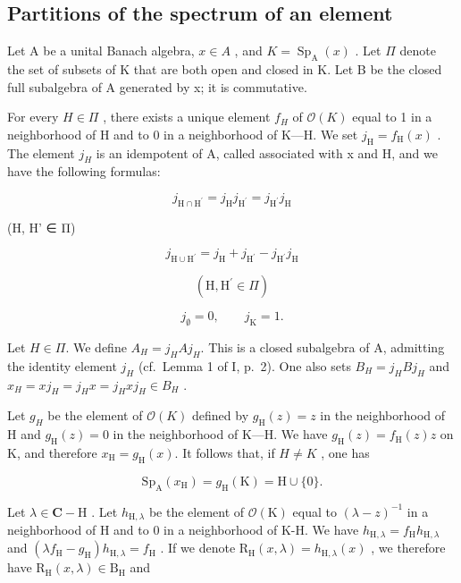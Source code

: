 \subsection{Partitions of the spectrum of an element}

Let A be a unital Banach algebra, \(x \in A\) , and \(K = \operatorname{Sp}_{\mathrm{A}}(x)\) . Let \(\Pi\) denote the set of subsets of K that are both open and closed in K. Let B be the closed full subalgebra of A generated by x; it is commutative.

For every \(H \in \Pi\) , there exists a unique element \(f_{H}\) of \(\mathcal{O}(K)\) equal to 1 in a neighborhood of H and to 0 in a neighborhood of K---H. We set \(j_{\mathrm{H}} = f_{\mathrm{H}}(x)\) . The element \(j_{H}\) is an idempotent of A, called associated with x and H, and we have the following formulas:

\[
j _ {\mathrm{H} \cap \mathrm{H} ^ {\prime}} = j _ {\mathrm{H}} j _ {\mathrm{H} ^ {\prime}} = j _ {\mathrm{H} ^ {\prime}} j _ {\mathrm{H}}\tag{15}
\]

(H, H' ∈ Π)

\[
j _ {\mathrm {H\cup H^ {\prime}}} = j _ {\mathrm{H}} + j _ {\mathrm {H^ {\prime}}} - j _ {\mathrm {H^ {\prime}}} j _ {\mathrm{H}}\tag{16}
\]

\[
(\mathrm{H}, \mathrm{H} ^ {\prime} \in \Pi)
\]

\[
j _ {\emptyset} = 0, \qquad j _ {\mathrm{K}} = 1.
\]

Let \(H \in \Pi\). We define \(A_{H} = j_{H}Aj_{H}\). This is a closed subalgebra of A, admitting the identity element \(j_{H}\) (cf.~Lemma 1 of I, p.~2). One also sets \(B_{H} = j_{H}Bj_{H}\) and \(x_{H} = xj_{H} = j_{H}x = j_{H}xj_{H} \in B_{H}\) .

Let \(g_{H}\) be the element of \(\mathcal{O}(K)\) defined by \(g_{\mathrm{H}}(z)=z\) in the neighborhood of H and \(g_{\mathrm{H}}(z)=0\) in the neighborhood of K---H. We have \(g_{\mathrm{H}}(z)=f_{\mathrm{H}}(z)z\) on K, and therefore \(x_{\mathrm{H}}=g_{\mathrm{H}}(x)\). It follows that, if \(H\neq K\) , one has

\[
\mathrm{Sp} _ {\mathrm{A}} (x _ {\mathrm{H}}) = g _ {\mathrm{H}} (\mathrm{K}) = \mathrm{H} \cup \{0 \}.
\]

Let \(\lambda \in \mathbf{C} - \mathrm{H}\) . Let \(h_{\mathrm{H},\lambda}\) be the element of \(\mathcal{O}(\mathrm{K})\) equal to \((\lambda - z)^{-1}\) in a neighborhood of H and to 0 in a neighborhood of K-H. We have \(h_{\mathrm{H},\lambda} = f_{\mathrm{H}}h_{\mathrm{H},\lambda}\) and \((\lambda f_{\mathrm{H}} - g_{\mathrm{H}})h_{\mathrm{H},\lambda} = f_{\mathrm{H}}\) . If we denote \(\mathrm{R_H}(x,\lambda) = h_{\mathrm{H},\lambda}(x)\) , we therefore have \(\mathrm{R_H}(x,\lambda) \in \mathrm{B_H}\) and

